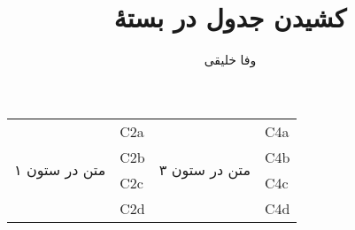 \documentclass{article}
\title{کشیدن جدول در بستهٔ \lr{longtable}}
\author{وفا خلیقی}
\begin{document}
\begin{tabular}{|l|l|l|l|}   \hline
\multirow{4}{14mm}{متن در ستون ۱}
    & C2a & \multirow{4}{14mm}{متن در ستون ۳}
                & C4a      \\
    & C2b &     & C4b      \\
    & C2c &     & C4c      \\
    & C2d &     & C4d      \\\hline
\end{tabular}
\end{document}
